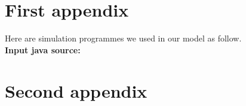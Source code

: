 \begin{appendices}
	
	\section*{First appendix} %
	
	Here are simulation programmes we used in our model as follow.\\
	
	\textbf{\textcolor[rgb]{0.98,0.00,0.00}{Input java source:}}
	

	\section*{Second appendix}
	
	
\end{appendices}